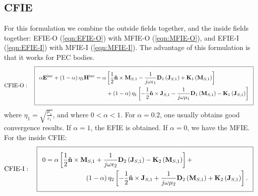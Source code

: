 \documentclass[a4paper,10pt]{book}
\newcommand{\field}[1]{\mathbf{#1}}
\newcommand{\current}[1]{\mathbf{#1}}
\newcommand{\vect}[1]{\mathbf{#1}}
\newcommand{\operator}[1]{\mathbf{#1}}
\begin{document}
\subsection{CFIE}
%
\par
For this formulation we combine the outside fields together, and the inside fields together: EFIE-O (\ref{eqn:EFIE-O}) with MFIE-O (\ref{eqn:MFIE-O}), and EFIE-I (\ref{eqn:EFIE-I}) with MFIE-I (\ref{eqn:MFIE-I}). The advantage of this formulation is that it works for PEC bodies.
\begin{equation}\label{eqn:CFIE-O}
  \addtolength{\fboxsep}{5pt} 
 \text{CFIE-O}: \quad   \boxed{ 
   \begin{split} 
      \alpha \field{E}^\text{inc} + \left(1-\alpha \right) \eta_1\field{H}^\text{inc} &= \alpha \left[\frac{1}{2} \vect{\hat{n}} \times \current{M}_{S,1} - \frac{1}{j \omega \epsilon_1} \operator{D}_1 \left( \current{J}_{S,1}\right) + \operator{K}_1 \left(\current{M}_{S,1}\right) \right]  \\ 
      & \qquad + \left(1-\alpha \right) \eta_1 \left[ - \frac{1}{2} \vect{\hat{n}} \times \current{J}_{S,1} - \frac{1}{j \omega \mu_1} \operator{D}_1 \left( \current{M}_{S,1}\right) - \operator{K}_1 \left(\current{J}_{S,1}\right) \right]
   \end{split} 
   } 
\end{equation}
where $\eta_1 = \sqrt{\frac{\mu_1}{\varepsilon_1}}$, and where $0<\alpha<1$. For $\alpha = 0.2$, one usually obtains good convergence results. If $\alpha = 1$, the EFIE is obtained. If $\alpha = 0$, we have the MFIE. For the inside CFIE:
\begin{equation}\label{eqn:CFIE-I}
  \addtolength{\fboxsep}{5pt} 
 \text{CFIE-I}: \quad   \boxed{ 
   \begin{split} 
      0 &= \alpha \left[\frac{1}{2} \vect{\hat{n}} \times \current{M}_{S,1} + \frac{1}{j \omega \epsilon_2} \operator{D}_2\left(\current{J}_{S,1}\right) -  \operator{K}_2\left( \current{M}_{S,1}\right) \right] + \\ &\qquad \qquad \qquad\left(1-\alpha \right) \eta_2 \left[ - \frac{1}{2} \vect{\hat{n}} \times \current{J}_{S,1} + \frac{1}{j \omega \mu_2} \operator{D}_2\left(\current{M}_{S,1}\right) +  \operator{K}_2\left( \current{J}_{S,1}\right) \right].
   \end{split} 
   } 
\end{equation}
\end{document}
